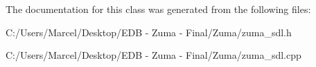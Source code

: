 The documentation for this class was generated from the following files\-:\begin{DoxyCompactItemize}
\item 
C\-:/\-Users/\-Marcel/\-Desktop/\-E\-D\-B -\/ Zuma -\/ Final/\-Zuma/zuma\-\_\-sdl.\-h\item 
C\-:/\-Users/\-Marcel/\-Desktop/\-E\-D\-B -\/ Zuma -\/ Final/\-Zuma/zuma\-\_\-sdl.\-cpp\end{DoxyCompactItemize}

